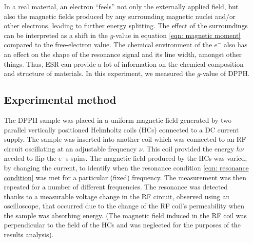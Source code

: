 \documentclass[a4paper]{jpconf}
\numberwithin{equation}{section}
\begin{document}
In a real material, an electron ``feels'' not only the externally applied field, but also the magnetic fields produced by any surrounding magnetic nuclei and/or other electrons, leading to further energy splitting. The effect of the surroundings can be interpreted as a shift in the $g$-value in equation \eqref{eqn: magnetic moment} compared to the free-electron value. The chemical environment of the $e^-$ also has an effect on the shape of the resonance signal and its line width, amongst other things. Thus, ESR can provide a lot of information on the chemical composition and structure of materials. In this experiment, we measured the $g$-value of DPPH.

\subsection{Experimental method}
The DPPH sample was placed in a uniform magnetic field generated by two parallel vertically positioned Helmholtz coils (HCs) connected to a DC current supply. The sample was inserted into another coil which was connected to an RF circuit oscillating at an adjustable frequency $\nu$. This coil provided the energy $h\nu$ needed to flip the $e^-$s spins. The magnetic field produced by the HCs was varied, by changing the current, to identify when the resonance condition \eqref{eqn: resonance condition} was met for a particular (fixed) frequency. The measurement was then repeated for a number of different frequencies. The resonance was detected thanks to a measurable voltage change in the RF circuit, observed using an oscilloscope, that occurred due to the change of the RF coil's permeability when the sample was absorbing energy. (The magnetic field induced in the RF coil was perpendicular to the field of the HCs and was neglected for the purposes of the results analysis).
\end{document}
